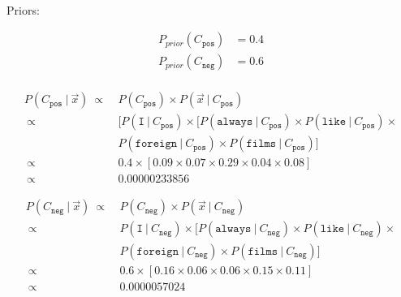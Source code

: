 \documentclass{article}
\newcommand\given[1][]{\:#1\vert\:}
\begin{document}
\paragraph{} Priors:

\begin{equation}
    \begin{split}
        P_{prior}(C_{\texttt{pos}}) &= 0.4 \\
        P_{prior}(C_{\texttt{neg}}) &= 0.6 \\
    \end{split}
\end{equation}

\begin{equation}
    \begin{split}
        P(C_{\texttt{pos}} \given \vec{x})\ \mathbin{\propto}&\ P(C_{\texttt{pos}}) \times P(\vec{x} \given C_{\texttt{pos}}) \\
        \ \mathbin{\propto}&\ [P(\texttt{I} \given C_{\texttt{pos}}) \times [P(\texttt{always} \given C_{\texttt{pos}}) \times P(\texttt{like} \given C_{\texttt{pos}}) \times \\
        &\ P(\texttt{foreign} \given C_{\texttt{pos}}) \times P(\texttt{films} \given C_{\texttt{pos}}) ]\\
        \ \mathbin{\propto}&\ 0.4 \times [0.09 \times 0.07 \times 0.29  \times 0.04 \times 0.08] \\
        \ \mathbin{\propto}&\ 0.00000233856
    \end{split}
\end{equation}

\begin{equation}
    \begin{split}
        P(C_{\texttt{neg}} \given \vec{x})\ \mathbin{\propto}&\ P(C_{\texttt{neg}}) \times P(\vec{x} \given C_{\texttt{neg}}) \\
        \ \mathbin{\propto}&\ P(\texttt{I} \given C_{\texttt{neg}}) \times [P(\texttt{always} \given C_{\texttt{neg}}) \times P(\texttt{like} \given C_{\texttt{neg}}) \times \\
        &\ P(\texttt{foreign} \given C_{\texttt{neg}}) \times P(\texttt{films} \given C_{\texttt{neg}})] \\
        \ \mathbin{\propto}&\ 0.6 \times [0.16 \times 0.06 \times 0.06 \times 0.15 \times 0.11] \\
        \ \mathbin{\propto}&\ 0.0000057024
    \end{split}
\end{equation}
\end{document}
